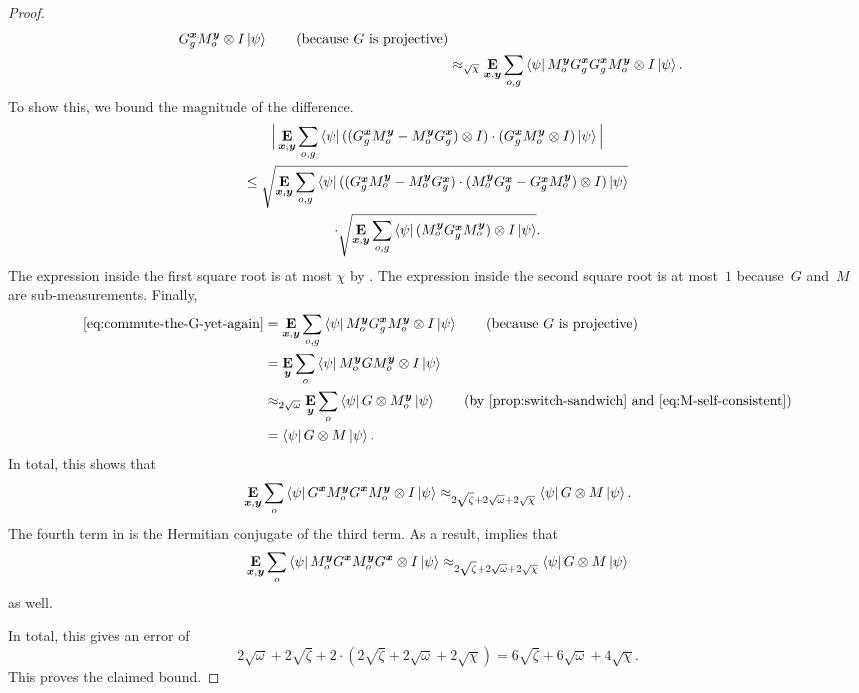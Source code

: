 \begin{proof}
\begin{align}
        G^{{\boldsymbol{x}}}_{g} M^{\boldsymbol{y}}_o \otimes I\ket{\psi} \tag{because~$G$ is projective}\\
& \approx_{\sqrt{\chi}} 
\mathop{\bf E\/}_{{\boldsymbol{x}}, \boldsymbol{y}} \sum_{o,g}  \bra{\psi}   M^{\boldsymbol{y}}_{o} G^{{\boldsymbol{x}}}_g G^{{\boldsymbol{x}}}_g
        M^{\boldsymbol{y}}_{o}  \otimes I\ket{\psi}. \label{eq:commute-the-G-yet-again}
\end{align}
To show this, we bound the magnitude of the difference.
\begin{multline*}
\Big|\mathop{\bf E\/}_{{\boldsymbol{x}}, \boldsymbol{y}} \sum_{o, g}  \bra{\psi} ((G^{{\boldsymbol{x}}}_g
        M^{\boldsymbol{y}}_{o} - M^{\boldsymbol{y}}_o G^{{\boldsymbol{x}}}_g)  \otimes I)  \cdot(G^{{\boldsymbol{x}}}_{g} M^{\boldsymbol{y}}_o  \otimes I ) \ket{\psi}\Big|\\
\leq\sqrt{\mathop{\bf E\/}_{{\boldsymbol{x}}, \boldsymbol{y}} \sum_{o, g} \bra{\psi} ((G^{{\boldsymbol{x}}}_g M^{\boldsymbol{y}}_o - M^{\boldsymbol{y}}_o G^{{\boldsymbol{x}}}_g) \cdot (M^{\boldsymbol{y}}_o
        G^{{\boldsymbol{x}}}_{g} - G^{{\boldsymbol{x}}}_g M^{\boldsymbol{y}}_o)  \otimes I)\ket{\psi}}\\
        \cdot \sqrt{\mathop{\bf E\/}_{{\boldsymbol{x}}, \boldsymbol{y}} \sum_{o, g}  \bra{\psi} (M^{\boldsymbol{y}}_o G^{{\boldsymbol{x}}}_g M^{\boldsymbol{y}}_o) \otimes I \ket{\psi}}.
\end{multline*}
The expression inside the first square root is at most $\chi$ by .
The expression inside the second square root is at most~$1$ because~$G$ and~$M$ are sub-measurements.
Finally,
\begin{align*}
\eqref{eq:commute-the-G-yet-again}
&=\E_{\bx, \by} \sum_{o, g}  \bra{\psi}   M^{\by}_{o} G^{\bx}_g
        M^{\by}_{o}  \ot I\ket{\psi} \tag{because~$G$ is projective}\\
&=\E_{\by} \sum_o \bra{\psi} M^{\by}_{o} G M^{\by}_{o} \otimes I \ket{\psi}\\
&\approx_{2\sqrt{\omega}} \E_{\by} \sum_o \bra{\psi} G \ot M^{\by}_o  \ket{\psi} \tag{by \Cref{prop:switch-sandwich} and \Cref{eq:M-self-consistent}}\\
&= \bra{\psi} G \ot M \ket{\psi}.
\end{align*}
In total, this shows that
\begin{equation}\label{eq:term-three-for-use-right-now}
\mathop{\bf E\/}_{{\boldsymbol{x}}, \boldsymbol{y}} \sum_o  \bra{\psi} G^{{\boldsymbol{x}}} M^{\boldsymbol{y}}_o
        G^{{\boldsymbol{x}}} M^{\boldsymbol{y}}_o \otimes I \ket{\psi}
        \approx_{2 \sqrt{\zeta} + 2 \sqrt{\omega} + 2 \sqrt{\chi}} \bra{\psi} G \otimes M \ket{\psi}.
\end{equation}
The fourth term in  is the Hermitian conjugate of the third term. As a result,  implies that
\begin{equation*}
\mathop{\bf E\/}_{{\boldsymbol{x}}, \boldsymbol{y}} \sum_o  \bra{\psi} M^{\boldsymbol{y}}_o G^{{\boldsymbol{x}}} M^{\boldsymbol{y}}_o G^{{\boldsymbol{x}}} \otimes I \ket{\psi}
        \approx_{2 \sqrt{\zeta} + 2 \sqrt{\omega} + 2 \sqrt{\chi}} \bra{\psi} G \otimes M \ket{\psi}
\end{equation*}
as well.

In total, this gives an error of
\begin{equation*}
2\sqrt{\omega}
+ 2\sqrt{\zeta}
+ 2 \cdot\left(2 \sqrt{\zeta} + 2 \sqrt{\omega} + 2 \sqrt{\chi}\right)
= 6 \sqrt{\zeta} + 6 \sqrt{\omega} + 4 \sqrt{\chi}.
\end{equation*}
This proves the claimed bound.
\end{proof}

